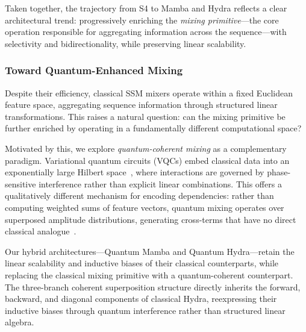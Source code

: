 \documentclass[conference]{IEEEtran}
\begin{document}
Taken together, the trajectory from S4 to Mamba and Hydra reflects a clear architectural trend: progressively enriching the \textit{mixing primitive}—the core operation responsible for aggregating information across the sequence—with selectivity and bidirectionality, while preserving linear scalability.

\subsubsection{Toward Quantum-Enhanced Mixing}

Despite their efficiency, classical SSM mixers operate within a fixed Euclidean feature space, aggregating sequence information through structured linear transformations. This raises a natural question: can the mixing primitive be further enriched by operating in a fundamentally different computational space?

Motivated by this, we explore \textit{quantum-coherent mixing} as a complementary paradigm. Variational quantum circuits (VQCs) embed classical data into an exponentially large Hilbert space~\cite{Schuld2022}, where interactions are governed by phase-sensitive interference rather than explicit linear combinations. This offers a qualitatively different mechanism for encoding dependencies: rather than computing weighted sums of feature vectors, quantum mixing operates over superposed amplitude distributions, generating cross-terms that have no direct classical analogue~\cite{havlicek2019supervised, Schuld2022}.

Our hybrid architectures—Quantum Mamba and Quantum Hydra—retain the linear scalability and inductive biases of their classical counterparts, while replacing the classical mixing primitive with a quantum-coherent counterpart. The three-branch coherent superposition structure directly inherits the forward, backward, and diagonal components of classical Hydra, reexpressing their inductive biases through quantum interference rather than structured linear algebra. 


\end{document}
